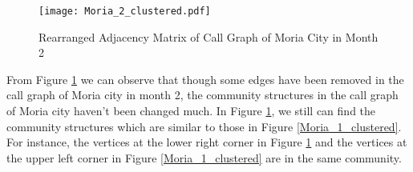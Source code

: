\begin{figure}[!t]
\centering
\texttt{[image: Moria\_2\_clustered.pdf]}
\caption{Rearranged Adjacency Matrix of Call Graph of Moria City in Month 2}
\label{Moria_2_clustered}
\end{figure}

From Figure \ref{Moria_2_clustered} we can observe that though some edges have been removed in the call graph of Moria city in month 2, the community structures in the call graph of Moria city haven't been changed much. In  Figure \ref{Moria_2_clustered}, we still can find the community structures which are similar to those in Figure \ref{Moria_1_clustered}. For instance, the vertices at the lower right corner in Figure \ref{Moria_2_clustered} and the vertices at the upper left corner in Figure \ref{Moria_1_clustered} are in the same community.   